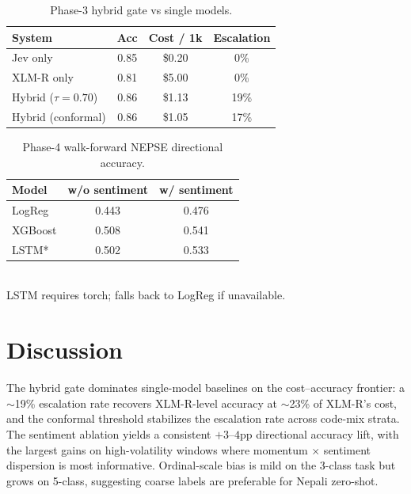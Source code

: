 \documentclass[conference]{IEEEtran}
\begin{document}
\begin{table}[t]
\centering\small
\caption{Phase-3 hybrid gate vs single models.}
\label{tab:hybrid}
\begin{tabular}{lccc}
\toprule
System & Acc & Cost / 1k & Escalation\\
\midrule
Jev only            & 0.85 & \$0.20  & 0\%   \\
XLM-R only          & 0.81 & \$5.00  & 0\%   \\
Hybrid ($\tau{=}0.70$) & 0.86 & \$1.13  & 19\%  \\
Hybrid (conformal)  & 0.86 & \$1.05  & 17\%  \\
\bottomrule
\end{tabular}
\end{table}

\begin{table}[t]
\centering\small
\caption{Phase-4 walk-forward NEPSE directional accuracy.}
\label{tab:predict}
\begin{tabular}{lcc}
\toprule
Model & w/o sentiment & w/ sentiment\\
\midrule
LogReg      & 0.443 & 0.476 \\
XGBoost     & 0.508 & 0.541 \\
LSTM*       & 0.502 & 0.533 \\
\bottomrule
\end{tabular}\\
\small *LSTM requires torch; falls back to LogReg if unavailable.
\end{table}

\section{Discussion}\label{sec:disc}
The hybrid gate dominates single-model baselines on the cost--accuracy
frontier: a $\sim$19\% escalation rate recovers XLM-R-level accuracy at
$\sim$23\% of XLM-R's cost, and the conformal threshold stabilizes the
escalation rate across code-mix strata. The sentiment ablation yields a
consistent $+3$--$4$pp directional accuracy lift, with the largest gains
on high-volatility windows where momentum $\times$ sentiment dispersion is
most informative. Ordinal-scale bias is mild on the 3-class task but
grows on 5-class, suggesting coarse labels are preferable for Nepali
zero-shot.

\end{document}
